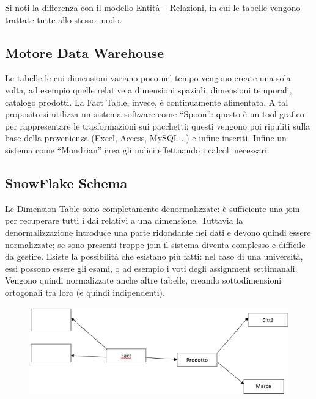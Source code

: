 Si noti la differenza con il modello Entità – Relazioni, in cui le tabelle vengono trattate tutte allo stesso modo. 

\subsection{Motore Data Warehouse}

Le tabelle le cui dimensioni variano poco nel tempo vengono create una sola volta, ad esempio quelle relative a dimensioni spaziali, dimensioni temporali, catalogo prodotti. La Fact Table, invece, è continuamente alimentata. A tal proposito si utilizza un sistema software come “Spoon”: questo è un tool grafico per rappresentare le trasformazioni sui pacchetti; questi vengono poi ripuliti sulla base della provenienza (Excel, Access, MySQL...) e infine inseriti. Infine un sistema come “Mondrian” crea gli indici effettuando i calcoli necessari. 
  
\subsection{SnowFlake Schema}

Le Dimension Table sono completamente denormalizzate: è sufficiente una join per recuperare tutti i dai relativi a una dimensione. Tuttavia la denormalizzazione introduce una parte ridondante nei dati e devono quindi essere normalizzate; se sono presenti troppe join il sistema diventa complesso e difficile da gestire. Esiste la possibilità che esistano più fatti: nel caso di una università, essi possono essere gli esami, o ad esempio i voti degli assignment settimanali. Vengono quindi normalizzate anche altre tabelle, creando sottodimensioni ortogonali tra loro (e quindi indipendenti).  

\begin{center}
\begin{figure}[H]
\centering
\includegraphics[scale=0.8]{figures/fact_prodotto.png}
\end{figure}
\end{center}

